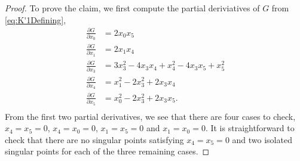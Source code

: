 \begin{proof}
To prove the claim, we first compute the partial deriviatives of $G$ from \eqref{eq:K'1Defining},
  \begin{align*}
  \frac{\partial G}{\partial x_0} &=  2x_0x_5\\
  \frac{\partial G}{\partial x_1} &=  2x_1x_4\\
  \frac{\partial G}{\partial x_3} &=  3x_3^2-4x_3x_4+x_4^2-4x_3x_5+x_5^2\\
  \frac{\partial G}{\partial x_4} &=  x_1^2-2x_3^2+2x_3x_4\\
  \frac{\partial G}{\partial x_5} &=  x_0^2-2x_3^2+2x_3x_5.\\
  \end{align*}
From the first two partial derivatives, we see that there are four cases to check, $x_4=x_5=0$, $x_4=x_0=0$, $x_1=x_5=0$ and $x_1=x_0=0$. It is straightforward to check that there are no singular points satisfying $x_4=x_5=0$ and two isolated singular points for each of the three remaining cases.
%
%
%
%
\end{proof}

